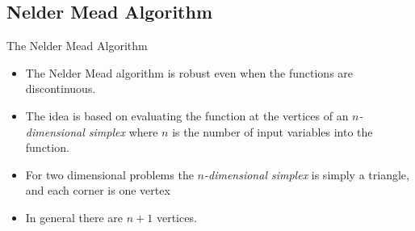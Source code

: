 \documentclass[10pt]{beamer}
\begin{document}
                                                                                              \subsection{Nelder Mead Algorithm}
                                                                                              \begin{frame}{The Nelder Mead Algorithm}
                                                                                                \begin{itemize}
                                                                                                \item The Nelder Mead algorithm is robust even when the functions are discontinuous.

                                                                                                \item The idea is based on evaluating the function at the vertices of an {\em $n$-dimensional simplex} where $n$ is the number of input variables into the function.

                                                                                                \item For two dimensional problems the {\em $n$-dimensional simplex} is simply a triangle, and each corner is one vertex

                                                                                                \item In general there are $n+1$ vertices.
                                                                                                \end{itemize}
                                                                                              \end{frame}
\end{document}
